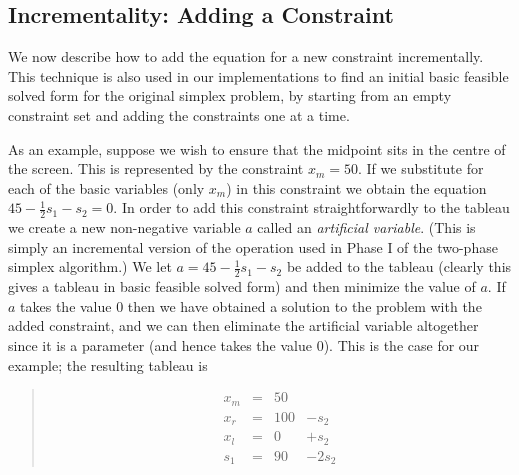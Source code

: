 \documentclass{article}
\newcommand{\ignore}[1]{}
\begin{document}
\ignore{ %
\begin{quote}\vspace*{-1ex}
\textbf{Simplex algorithm} 
\\ {\sc input:} An  optimization problem $(C_S \wedge C_P,f)$ 
in basic feasible solved form.
\\ {\sc output:} Either  $false$ indicating that $(C_S \wedge C_P,f)$
does not have an optimal solution or else an optimal solution
to  $(C_S \wedge C_P,f)$.
\\ {\sc method:} 
Call , and let $\tuple{ F, C', f'}$ be the result.
If $F$ is $false$, output $false$, otherwise output the basic feasible
solution corresponding to $(C',f')$.
\end{quote}\vspace{-0.9ex}
} %

\subsection{Incrementality: Adding a Constraint}
\label{adding-constraints}

We now describe how to add the equation for a new constraint incrementally.
This technique is also used in our implementations to find an initial basic
feasible solved form for the original simplex problem, by starting from an
empty constraint set and adding the constraints one at a time.

As an example, suppose we wish to ensure that the midpoint
sits in the centre of the screen.  
This is represented by the constraint
$x_m = 50$.  If we substitute for each of the basic variables
(only $x_m$) in this constraint we obtain the equation
$45 - \frac{1}{2} s_1 - s_2 = 0$.  
In order to add this constraint
straightforwardly to the tableau we create a new 
non-negative variable $a$ called an \emph{artificial variable}.
(This is simply an incremental version of the operation used in
Phase I of the two-phase simplex algorithm.)
We let $a = 45 - \frac{1}{2} s_1 - s_2$ be added to the tableau
(clearly this gives a tableau in basic feasible solved form)
and then minimize the value of $a$.
If $a$ takes the value $0$
then we have obtained a solution to the problem
with the added constraint, and
we can then eliminate the artificial variable altogether since it is 
a parameter (and hence takes the value 0).  This is the case for our example;
the resulting tableau is
\begin{quote}\vspace*{-1ex}
$$
\begin{array}{rlrrr} 
x_m & = &50   \\
x_r & = &100 & - s_2 \\ \hline
x_l & = &0 & + s_2 \\
s_1 & = &90 & -2 s_2
\end{array}
$$
\end{quote}\vspace{-0.9ex}
\end{document}
